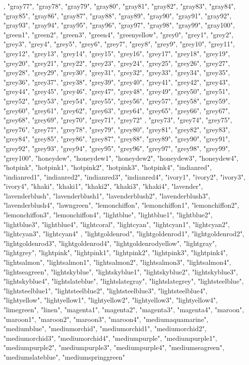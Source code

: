 \begin{itemize}
\begin{itemize}
    , "gray77", "gray78", "gray79", "gray80", "gray81", "gray82", "gray83", "gray84", "gray85", "gray86", "gray87", "gray88", "gray89", "gray90", "gray91", "gray92", "gray93", "gray94", "gray95", "gray96", "gray97", "gray98", "gray99", "gray100", "green1", "green2", "green3", "green4", "greenyellow", "grey0", "grey1", "grey2", "grey3", "grey4", "grey5", "grey6", "grey7", "grey8", "grey9", "grey10", "grey11", "grey12", "grey13", "grey14", "grey15", "grey16", "grey17", "grey18", "grey19", "grey20", "grey21", "grey22", "grey23", "grey24", "grey25", "grey26", "grey27", "grey28", "grey29", "grey30", "grey31", "grey32", "grey33", "grey34", "grey35", "grey36", "grey37", "grey38", "grey39", "grey40", "grey41", "grey42", "grey43", "grey44", "grey45", "grey46", "grey47", "grey48", "grey49", "grey50", "grey51", "grey52", "grey53", "grey54", "grey55", "grey56", "grey57", "grey58", "grey59", "grey60", "grey61", "grey62", "grey63", "grey64", "grey65", "grey66", "grey67", "grey68", "grey69", "grey70", "grey71", "grey72"
    , "grey73", "grey74", "grey75", "grey76", "grey77", "grey78", "grey79", "grey80", "grey81", "grey82", "grey83", "grey84", "grey85", "grey86", "grey87", "grey88", "grey89", "grey90", "grey91", "grey92", "grey93", "grey94", "grey95", "grey96", "grey97", "grey98", "grey99", "grey100", "honeydew", "honeydew1", "honeydew2", "honeydew3", "honeydew4", "hotpink", "hotpink1", "hotpink2", "hotpink3", "hotpink4", "indianred", "indianred1", "indianred2", "indianred3", "indianred4", "ivory1", "ivory2", "ivory3", "ivory4", "khaki", "khaki1", "khaki2", "khaki3", "khaki4", "lavender", "lavenderblush", "lavenderblush1", "lavenderblush2", "lavenderblush3", "lavenderblush4", "lawngreen", "lemonchiffon", "lemonchiffon1", "lemonchiffon2", "lemonchiffon3", "lemonchiffon4", "lightblue", "lightblue1", "lightblue2", "lightblue3", "lightblue4", "lightcoral", "lightcyan", "lightcyan1", "lightcyan2", "lightcyan3", "lightcyan4"
    , "lightgoldenrod", "lightgoldenrod1", "lightgoldenrod2", "lightgoldenrod3", "lightgoldenrod4", "lightgoldenrodyellow", "lightgray", "lightgrey", "lightpink", "lightpink1", "lightpink2", "lightpink3", "lightpink4", "lightsalmon", "lightsalmon1", "lightsalmon2", "lightsalmon3", "lightsalmon4", "lightseagreen", "lightskyblue", "lightskyblue1", "lightskyblue2", "lightskyblue3", "lightskyblue4", "lightslateblue", "lightslategray", "lightslategrey", "lightsteelblue", "lightsteelblue1", "lightsteelblue2", "lightsteelblue3", "lightsteelblue4", "lightyellow", "lightyellow1", "lightyellow2", "lightyellow3", "lightyellow4", "limegreen", "linen", "magenta1", "magenta2", "magenta3", "magenta4", "maroon", "maroon1", "maroon2", "maroon3", "maroon4", "mediumaquamarine", "mediumblue", "mediumorchid", "mediumorchid1", "mediumorchid2", "mediumorchid3", "mediumorchid4", "mediumpurple", "mediumpurple1", "mediumpurple2", "mediumpurple3", "mediumpurple4", "mediumseagreen", "mediumslateblue", "mediumspringgreen"

\end{itemize}
\end{itemize}
